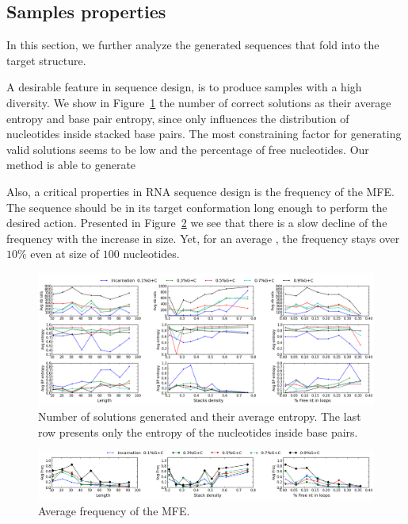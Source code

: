 \subsection{Samples properties}

In this section, we further analyze the generated sequences that fold into the 
target structure. 

A desirable feature in sequence design, is to produce samples with a high
diversity. We show in Figure~\ref{fig:nb_sols_entropy} the number of correct
solutions as their average entropy and base pair entropy, since 
\ourprog  only influences the distribution of nucleotides inside 
stacked base pairs. The most constraining factor for generating valid
 solutions seems to be  low \GCContent and the percentage of free nucleotides. Our method is able to generate 

Also, a critical properties in RNA sequence design is 
the frequency of the MFE. 
The sequence should be in its target conformation long enough to
perform the desired action. Presented in Figure~\ref{fig:freq} we see that
there is a slow decline of the frequency with the increase in size. Yet,
for an average \GCContent, the frequency stays over $10\%$ even
at size of $100$ nucleotides.


\begin{figure}[ht!]
	\centering
	\includegraphics[width=\textwidth]{Figures/nb_sols_entropy.png}
	\caption{Number of solutions generated and their average entropy. 
	The last row presents only the entropy of the nucleotides inside base 
	pairs.}
	\label{fig:nb_sols_entropy}
\end{figure}



\begin{figure}[ht!]
	\centering
	\includegraphics[width=\textwidth]{Figures/freq.png}
	\caption{Average frequency of the MFE.}
	\label{fig:freq}
\end{figure}

